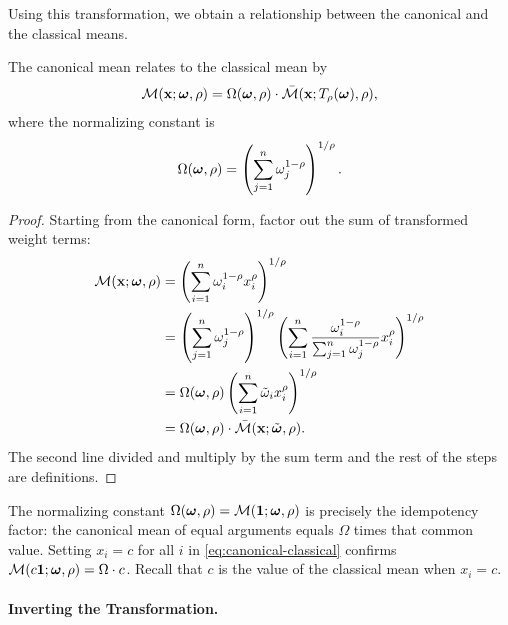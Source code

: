 Using this transformation, we obtain a relationship between the canonical and the classical means.
\begin{proposition}
\label{prop:canonical-classical}
The canonical mean relates to the classical mean by
\begin{equation}
\label{eq:canonical-classical}
\mathcal{M}(\mathbf{x}; \boldsymbol{\omega}, \rho) = \Omega(\boldsymbol{\omega}, \rho) \cdot \bar{\mathcal{M}}(\mathbf{x}; T_\rho(\boldsymbol{\omega}), \rho),
\end{equation}
where the normalizing constant is
\begin{equation}
\label{eq:Omega-def}
\Omega(\bom, \rho) = \left( \sum_{j=1}^{n} \omega_j^{1-\rho} \right)^{1/\rho}.

\end{equation}
\end{proposition}

\begin{proof}
Starting from the canonical form, factor out the sum of transformed weight terms:
\begin{align*}
\mathcal{M}(\mathbf{x}; \boldsymbol{\omega}, \rho) &= \left( \sum_{i=1}^{n} \omega_i^{1-\rho} x_i^\rho \right)^{1/\rho} \\
&= \left( \sum_{j=1}^{n} \omega_j^{1-\rho} \right)^{1/\rho} \left( \sum_{i=1}^{n} \frac{\omega_i^{1-\rho}}{\sum_{j=1}^{n} \omega_j^{1-\rho}} x_i^\rho \right)^{1/\rho} \\
&= \Omega(\boldsymbol{\omega}, \rho) \left( \sum_{i=1}^{n} \tilde{\omega}_i x_i^\rho \right)^{1/\rho} \\
&= \Omega(\boldsymbol{\omega}, \rho) \cdot \bar{\mathcal{M}}(\mathbf{x}; \tilde{\boldsymbol{\omega}}, \rho). \qedhere
\end{align*}
The second line divided and multiply by the sum term and the rest of the steps are definitions.
\end{proof}

\begin{calloutnote}
The normalizing constant $\Omega(\boldsymbol{\omega}, \rho) = \mathcal{M}(\mathbf{1};\boldsymbol{\omega},\rho)$ is precisely the idempotency factor: the canonical mean of equal arguments equals $\Omega$ times that common value. Setting $x_i = c$ for all $i$ in \cref{eq:canonical-classical} confirms $\mathcal{M}(c\mathbf{1}; \boldsymbol{\omega}, \rho) = \Omega \cdot c$. Recall that $c$ is the value of the classical mean when $x_i = c$.
\end{calloutnote}

\paragraph{Inverting the Transformation.}

